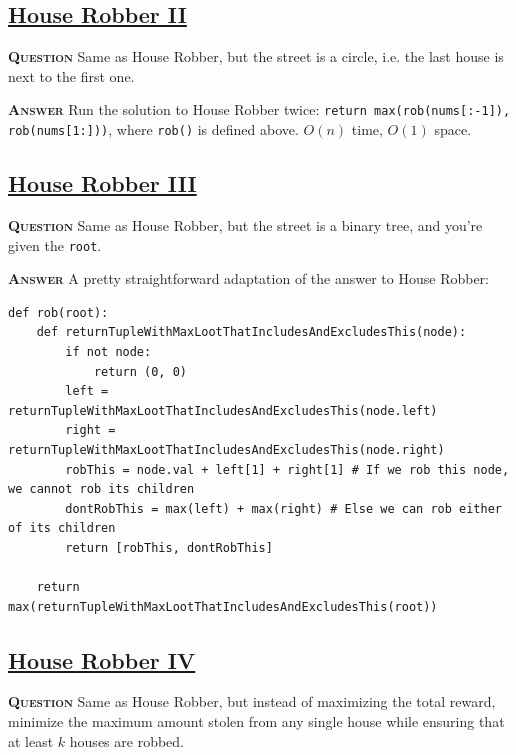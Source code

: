 \documentclass[table, xcdraw]{article}%
\begin{document}
\subsection{\href{https://leetcode.com/problems/house-robber-ii}{House Robber II}}

\textsc{\textbf{Question}} Same as House Robber, but the street is a circle, i.e. the last house is next to the first one.

\textsc{\textbf{Answer}} Run the solution to House Robber twice: \texttt{return max(rob(nums[:-1]), rob(nums[1:]))}, where \texttt{rob()} is defined above. $O(n)$ time, $O(1)$ space.

\subsection{\href{https://leetcode.com/problems/house-robber-iii}{House Robber III}}

\textsc{\textbf{Question}} Same as House Robber, but the street is a binary tree, and you're given the \texttt{root}.

\textsc{\textbf{Answer}} A pretty straightforward adaptation of the answer to House Robber:

\begin{verbatim}
def rob(root):
    def returnTupleWithMaxLootThatIncludesAndExcludesThis(node):
        if not node:
            return (0, 0)
        left = returnTupleWithMaxLootThatIncludesAndExcludesThis(node.left)
        right = returnTupleWithMaxLootThatIncludesAndExcludesThis(node.right)
        robThis = node.val + left[1] + right[1] # If we rob this node, we cannot rob its children
        dontRobThis = max(left) + max(right) # Else we can rob either of its children
        return [robThis, dontRobThis]

    return max(returnTupleWithMaxLootThatIncludesAndExcludesThis(root))
\end{verbatim}

\subsection{\href{https://leetcode.com/problems/house-robber-iv}{House Robber IV}}

\textsc{\textbf{Question}} Same as House Robber, but instead of maximizing the total reward, minimize the maximum amount stolen from any single house while ensuring that at least $k$ houses are robbed.
\end{document}
